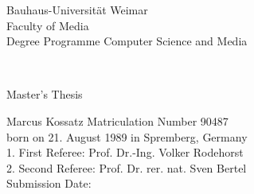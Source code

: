 
\begin{titlepage}

Bauhaus-Universität Weimar \\
Faculty of Media \\
Degree Programme Computer Science and Media \\

\vspace{4.5cm}

\begin{center}
  {\huge \titleFirst} \\[0.5cm]
  {\huge \titleSecond}
\end{center}

\vspace{2.5cm}

{\LARGE Master's Thesis}

\vspace{3.5cm}

Marcus Kossatz \hfill Matriculation Number 90487 \\
born on 21. August 1989 in Spremberg, Germany \\

1. First Referee: Prof. Dr.-Ing. Volker Rodehorst \\
2. Second Referee: Prof. Dr. rer. nat. Sven Bertel \\

Submission Date: \submissionDate

\end{titlepage}
